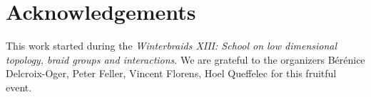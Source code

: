 \documentclass{amsart}
\theoremstyle{definition}
\begin{document}

\section*{Acknowledgements}

This work started during the \emph{Winterbraids XIII: School on low dimensional topology, braid groups and interactions}. We are grateful to the organizers Bérénice Delcroix-Oger, Peter Feller, Vincent Florens, Hoel Queffelec for this fruitful event.


{}


\label{sec:biblio}
\end{document}
